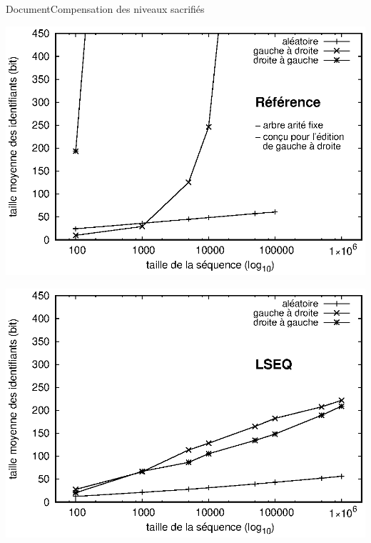 \begin{frame}{Document}{Compensation des niveaux sacrifiés}

  \hspace{-1cm}
  \begin{minipage}{0.45\textwidth}
    \begin{center}
      
    \end{center}
  \end{minipage}
  \hfill
  \begin{minipage}{0.45\textwidth}
    \begin{center}
      
    \end{center}
  \end{minipage}

  \vspace{0.4cm}\hspace{-1cm}
  \begin{minipage}{0.45\textwidth}
    \includegraphics[width=1.25\textwidth]{img/replication/logoot.eps}
  \end{minipage}
  \hspace{1.5cm}
  \begin{minipage}{0.45\textwidth}
    \includegraphics[width=1.25\textwidth]{img/replication/lseq.eps}
  \end{minipage}

\end{frame}

